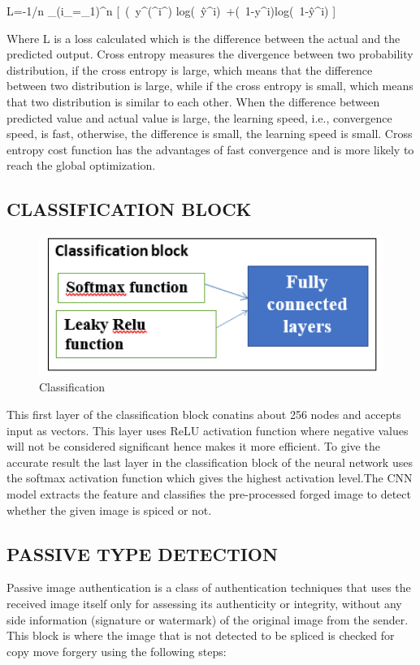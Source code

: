        L=-1/n \Sigma_(i_=_1)^n [\ (\ y^(^i^)  log(\ \^y^i)\ +(\ 1-y^i)log(\ 1-\^y^i) ]\
\newline  

Where L is a loss calculated which is the difference between the actual and the predicted output. 
Cross entropy measures the divergence between two probability distribution, if the cross entropy is large, which means that the difference between two distribution is large, while if the cross entropy is small, which means that two distribution is similar to each other.   
When the difference between predicted value and actual value is large, the learning speed, i.e., convergence speed, is fast, otherwise, the difference is small, the learning speed is small.  
Cross entropy cost function has the advantages of fast convergence and is more likely to reach the global optimization. 

\subsection{CLASSIFICATION BLOCK}
\begin{figure}[htp]
\centering
\includegraphics[scale=0.5,width=17cm]{Figures/classification.png}
\caption{Classification}
\label{fig:universe}
\end{figure}
This first layer of the classification block conatins about 256 nodes and accepts input as vectors. This layer uses ReLU activation function where negative values will not be considered significant hence makes it more efficient. To give the accurate result the last layer in the classification block of the neural network uses the softmax activation function which gives the highest activation level.The CNN model extracts the feature and classifies the pre-processed forged image to detect whether the given image is spiced or not.

\subsection{PASSIVE TYPE DETECTION}
Passive image authentication is a class of authentication techniques that uses the received image itself only for assessing its authenticity or integrity, without any side information (signature or watermark) of the original image from the sender.
This block is where the image that is not detected to be spliced is checked for copy move forgery using the following steps:

